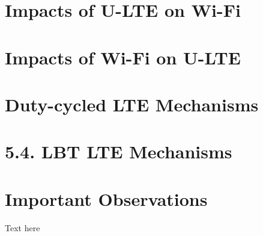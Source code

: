 \section{Impacts of U-LTE on Wi-Fi}

\section{Impacts of Wi-Fi on U-LTE}

\section{Duty-cycled LTE Mechanisms}

\section{5.4. LBT LTE Mechanisms}
     
\section{Important Observations}
Text here


